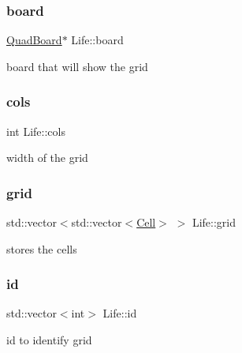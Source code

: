 \subsubsection{\texorpdfstring{board}{board}}
{\footnotesize\ttfamily \hyperlink{classQuadBoard}{Quad\+Board}$\ast$ Life\+::board}



board that will show the grid 

\mbox{\label{classLife_a31a428734f7dc76ca386963139699ac6}} 
\subsubsection{\texorpdfstring{cols}{cols}}
{\footnotesize\ttfamily int Life\+::cols\hspace{0.3cm}{\ttfamily [private]}}



width of the grid 

\mbox{\label{classLife_aa83b518c319016fa8f962d24a6e487a6}} 
\subsubsection{\texorpdfstring{grid}{grid}}
{\footnotesize\ttfamily std\+::vector$<$std\+::vector$<$\hyperlink{life_8h_a0133c02dfc35ffbaf07ad1a587dac4d1}{Cell}$>$ $>$ Life\+::grid\hspace{0.3cm}{\ttfamily [private]}}



stores the cells 

\mbox{\label{classLife_ab33d6ee162673a71742a3df07a0a2e2f}} 
\subsubsection{\texorpdfstring{id}{id}}
{\footnotesize\ttfamily std\+::vector$<$int$>$ Life\+::id\hspace{0.3cm}{\ttfamily [private]}}



id to identify grid 

\mbox{\label{classLife_a9b8514842a22ce3d280e9e576a149dab}} 
